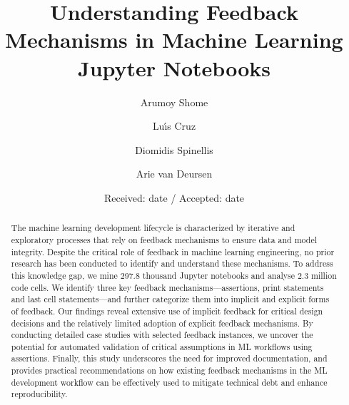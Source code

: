 \documentclass[smallextended]{svjour3}       %
\begin{document}
\title{Understanding Feedback Mechanisms in Machine Learning Jupyter Notebooks}


\author{Arumoy Shome\and
Lu{\'\i}s Cruz\and
  Diomidis Spinellis\and
  Arie van Deursen
}



\date{Received: date / Accepted: date}


\maketitle

\begin{abstract}
  The machine learning development lifecycle is characterized by iterative and exploratory processes that rely on feedback mechanisms to ensure data and model integrity. Despite the critical role of feedback in machine learning engineering, no prior research has been conducted to identify and understand these mechanisms. To address this knowledge gap, we mine 297.8 thousand Jupyter notebooks and analyse 2.3 million code cells. We identify three key feedback mechanisms---assertions, print statements and last cell statements---and further categorize them into implicit and explicit forms of feedback. Our findings reveal extensive use of implicit feedback for critical design decisions and the relatively limited adoption of explicit feedback mechanisms. By conducting detailed case studies with selected feedback instances, we uncover the potential for automated validation of critical assumptions in ML workflows using assertions. Finally, this study underscores the need for improved documentation, and provides practical recommendations on how existing feedback mechanisms in the ML development workflow can be effectively used to mitigate technical debt and enhance reproducibility.
\end{abstract}
\end{document}
